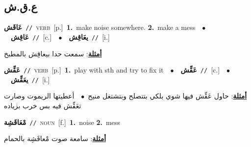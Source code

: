 \documentclass[10pt,a4paper,twoside]{article} %
\begin{document}
\begin{multicols}{2}
\vspace{-3mm}
\subsection*{\color{blue}\foreignlanguage{arabic}{ع.ق.ش}\color{blue}{}} 

{\setlength\topsep{0pt}\textbf{\foreignlanguage{arabic}{عَاقَش}}\ {\color{gray}\texttt{//}\color{black}}\ \textsc{verb}\ [p.]\ \textbf{1.}~make noise somewhere.  \textbf{2.}~make a mess\ \ $\bullet$\ \ \setlength\topsep{0pt}\textbf{\foreignlanguage{arabic}{عَاقِش}}\ {\color{gray}\texttt{//}\color{black}}\ [c.]\ \ $\bullet$\ \ \setlength\topsep{0pt}\textbf{\foreignlanguage{arabic}{يعَاقِش}}\ {\color{gray}\texttt{//}\color{black}}\ [i.]\  \begin{flushright}\color{gray}\foreignlanguage{arabic}{\textbf{\underline{\foreignlanguage{arabic}{أمثلة}}}: سمعت حدا بيعاقِش بالمطبخ}\end{flushright}\color{black}} \vspace{2mm}

{\setlength\topsep{0pt}\textbf{\foreignlanguage{arabic}{عَقِّش}}\ {\color{gray}\texttt{//}\color{black}}\ \textsc{verb}\ [p.]\ \textbf{1.}~play with sth and try to fix it\ \ $\bullet$\ \ \setlength\topsep{0pt}\textbf{\foreignlanguage{arabic}{عَقِّش}}\ {\color{gray}\texttt{//}\color{black}}\ [c.]\ \ $\bullet$\ \ \setlength\topsep{0pt}\textbf{\foreignlanguage{arabic}{يعَقِّش}}\ {\color{gray}\texttt{//}\color{black}}\ [i.]\  \begin{flushright}\color{gray}\foreignlanguage{arabic}{\textbf{\underline{\foreignlanguage{arabic}{أمثلة}}}: حاول عَقِّش  فيها شوي بلكي بتتصلح وبتشتغل منيح\ $\bullet$\ \  أعطيتها الريموت وصارت تعَقِّش  فيه بس خرب بزياده}\end{flushright}\color{black}} \vspace{2mm}

{\setlength\topsep{0pt}\textbf{\foreignlanguage{arabic}{مْعَاقَشِة}}\ {\color{gray}\texttt{//}\color{black}}\ \textsc{noun}\ [f.]\ \textbf{1.}~noise  \textbf{2.}~mess\  \begin{flushright}\color{gray}\foreignlanguage{arabic}{\textbf{\underline{\foreignlanguage{arabic}{أمثلة}}}: سامعة صوت مْعاقَشِة بالحمام}\end{flushright}\color{black}} \vspace{2mm}


\end{multicols}
\end{document}
